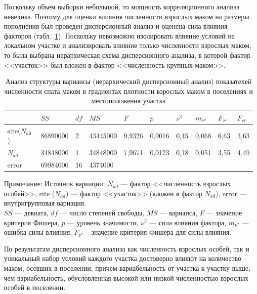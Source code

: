 Поскольку объем выборки небольшой, то мощность корреляционного анализа невелика. 
Поэтому для оценки влияния численности взрослых маком на размеры пополнения был проведен дисперсионный анализ и оценена сила влияния факторов (табл.~\ref{tab:ANOVA_site_Nad_spat}).
Поскольку невозможно изолировать влияние условий на локальном участке и анализировать влияние только численности взрослых маком, то была выбрана иерархическая схема дисперсионного анализа, в которой фактор <<участок>> был вложен в фактор <<численность крупных маком>>.
\begin{table}[p]
\caption{Анализ структуры вариансы (иерархический дисперсионный анализ) показателей численности спата маком в градиентах плотности взрослых маком в поселениях и местоположения участка}
\label{tab:ANOVA_site_Nad_spat}
\begin{center}
\begin{tabular}{|l|lll|ll|ll|ll|}
\hline
                & $SS$        & $df$ & $MS$       & $F$      & $p$        & $\nu^2$      & $m_{\nu^2}$       & $F_{\nu^2}$            & $F_{cr}$  \\ \hline
  site($N_{ad}$) & 86890000  & 2  & 43445000 & 9,9326 & 0,0016 & 0,45 & 0,068 & 6,63 & 3,63 \\
$N_{ad}$         & 34848000  & 1  & 34848000 & 7,9671 & 0,0123 & 0,18 & 0,051 & 3,55 & 4,49 \\
error       & 69984000  & 16 & 4374000  &        &          &              &              &              &      \\ \hline
\end{tabular}
\end{center}

\footnotesize{Примечание: Источник вариации: $N_{ad}$ --- фактор <<численность взрослых особей>>, 
site ($N_{ad}$) --- фактор <<участок>> (вложен в фактор $N_{ad}$),
error ---  внутригрупповая вариация. \\
$SS$ --- девиата, 
$df$ --- число степеней свободы, 
$MS$ --- варианса, 
$F$ --- значение критерия Фишера, 
$p$  --- уровень значимости,
$\nu^2$ --- сила влияния фактора,
$m_{\nu^2}$ --- ошибка силы влияния,
$F_{\nu^2}$ – значение критерия Фишера для силы влияния.}
\end{table}
По результатам дисперсионного анализа как численность взрослых особей, так и уникальный набор условий каждого участка достоверно влияют на количество маком, осевших в поселении, причем вариабельность от участка к участку выше, чем вариабельность, обусловленная высокой или низкой численностью взрослых особей в поселении. 

